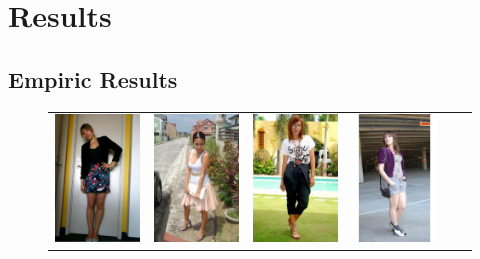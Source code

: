 \chapter{Results}\label{s:r}



\section{Empiric Results}

\begin{figure}[H]
	\centering
	\setlength{\tabcolsep}{0.1pt}
	\setlength{\fboxsep}{0pt}%
	\setlength{\fboxrule}{0.1pt}%
	\renewcommand{\arraystretch}{0.6}
	\begin{tabular}{cccccc}
		\includegraphics[width=.15\textwidth]{figures/processedimages/original/0153056.jpg} & 
		\includegraphics[width=.15\textwidth]{figures/processedimages/original/0169465.jpg} &
		\includegraphics[width=.15\textwidth]{figures/processedimages/original/0196875.jpg} &
		\includegraphics[width=.15\textwidth]{figures/processedimages/original/0201966.jpg} &

\end{tabular}
\end{figure}
